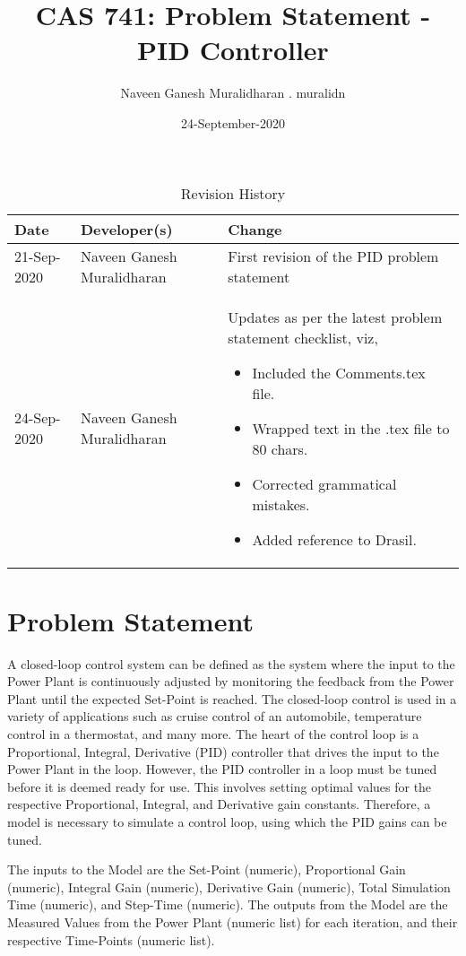 \documentclass{article}
\title{CAS 741: Problem Statement - \\PID Controller}
\author{Naveen Ganesh Muralidharan . muralidn}
\date{24-September-2020}
\begin{document}
\maketitle

\begin{table}[hp]
\caption{Revision History} \label{TblRevisionHistory}
\begin{tabularx}{\textwidth}{llX}
\toprule
\textbf{Date} & \textbf{Developer(s)} & \textbf{Change}\\
\midrule
21-Sep-2020 & Naveen Ganesh Muralidharan & First revision of the PID problem 
statement\\
24-Sep-2020 & Naveen Ganesh Muralidharan & Updates as per the latest problem
statement checklist, viz,
\begin{itemize}
\item Included the Comments.tex file. 
\item Wrapped text in the .tex file to 80 chars. 
\item Corrected grammatical mistakes.
\item Added reference to Drasil.
\end{itemize}\\
\bottomrule
\end{tabularx}
\end{table}

\section*{Problem Statement}

A closed-loop control system can be defined as the system where the input to the 
Power Plant is continuously adjusted by monitoring the feedback from the Power 
Plant until the expected Set-Point is reached. The closed-loop control is used 
in a variety of applications such as cruise control of an automobile, 
temperature control in a thermostat, and many more. The heart of the control 
loop is a Proportional, Integral, Derivative (PID) controller that drives the 
input to the Power Plant in the loop. However, the PID controller in a loop must 
be tuned before it is deemed ready for use. This involves setting optimal values 
for the respective Proportional, Integral, and Derivative gain constants. 
Therefore, a model is necessary to simulate a control loop, using which the 
PID gains can be tuned.

The inputs to the Model are the Set-Point (numeric), Proportional Gain 
(numeric), Integral Gain (numeric), Derivative Gain (numeric), Total 
Simulation Time (numeric), and Step-Time (numeric). The outputs from the Model 
are the Measured Values from the Power Plant (numeric list) for each iteration, 
and their respective Time-Points (numeric list).
\end{document}
